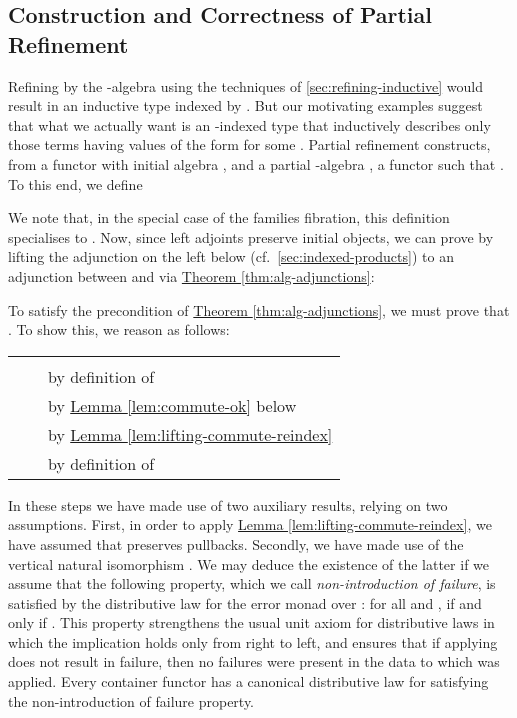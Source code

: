 \documentclass{LMCS}
\newcommand{\lemref}[1]{\hyperref[#1]{Lemma \ref*{#1}}}
\newcommand{\thmref}[1]{\hyperref[#1]{Theorem \ref*{#1}}}
\begin{document}
\subsection{Construction and Correctness of Partial Refinement}

Refining  by the -algebra  using the
techniques of \autoref{sec:refining-inductive} would result in an
inductive type indexed by . But our motivating examples suggest
that what we actually want is an -indexed type that inductively
describes only those terms having values of the form  for some
. Partial refinement constructs, from a functor  with
initial algebra , and a partial
-algebra , a functor  such that
. To this end, we define

We note that, in the special case of the families fibration, this
definition specialises to . Now, since left
adjoints preserve initial objects, we can prove  by lifting the adjunction on the left
below (cf.~\autoref{sec:indexed-products}) to an adjunction between
 and  via
\thmref{thm:alg-adjunctions}:
 

\noindent
To satisfy the precondition of \thmref{thm:alg-adjunctions}, we must
prove that . To show this, we reason as follows:
\begin{center}
  \begin{tabular}{cll}
    &  & \\
         &  &
    by definition of \\ 
     &  & by \lemref{lem:commute-ok} below \\ 
     &  & by
    \lemref{lem:lifting-commute-reindex} \\ 
         &  & by definition of 
  \end{tabular}
\end{center}
In these steps we have made use of two auxiliary results, relying on
two assumptions. First, in order to apply
\lemref{lem:lifting-commute-reindex}, we have assumed that 
preserves pullbacks. Secondly, we have made use of the vertical
natural isomorphism . We may deduce the
existence of the latter if we assume that the following property,
which we call \emph{non-introduction of failure}, is satisfied by the
distributive law  for the error monad  over : for all
 and ,  if and only if
.  This property strengthens the usual unit axiom for
distributive laws in which the implication holds only from right to
left, and ensures that if applying  does not result in
failure, then no failures were present in the data to which 
was applied. Every container functor has a canonical distributive law
for  satisfying the non-introduction of failure property.
\end{document}
